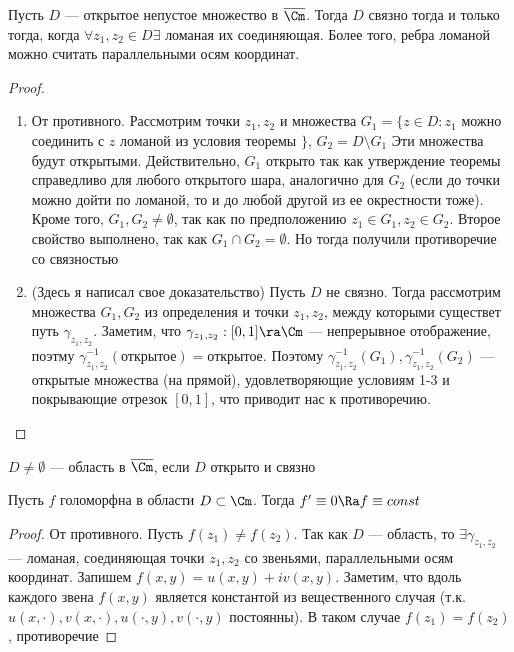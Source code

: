 \begin{proposition}
    Пусть \(D\) --- открытое непустое множество в \(\overline{\Cm}\). Тогда \(D\) связно тогда и только тогда, когда \(\forall z_1, z_2 \in D \exists\) ломаная их соединяющая. Более того, ребра ломаной можно считать параллельными осям координат.
\end{proposition}
\begin{proof}
    \begin{enumerate}
        \item[\(\Ra\)] От противного. Рассмотрим точки \(z_1, z_2\) и множества \(G_1 = \{z \in D: z_1\) можно соединить с \(z\) ломаной из условия теоремы \(\}\), \(G_2 = D \setminus G_1\) Эти множества будут открытыми. Действительно, \(G_1\) открыто так как утверждение теоремы справедливо для любого открытого шара, аналогично для \(G_2\) (если до точки можно дойти по ломаной, то и до любой другой из ее окрестности тоже). Кроме того, \(G_1, G_2 \ne \emptyset\), так как по предположению \(z_1 \in G_1, z_2 \in G_2\). Второе свойство выполнено, так как \(G_1 \cap G_2 = \emptyset\). Но тогда получили противоречие со связностью
        \item[\(\La\)] (Здесь я написал свое доказательство) Пусть \(D\) не связно. Тогда рассмотрим множества \(G_1, G_2\) из определения и точки \(z_1, z_2\), между которыми существет путь \(\gamma_{z_1, z_2}\). Заметим, что \(\gamma_{z_1, z_2}: [0, 1] \ra \Cm\) --- непрерывное отображение, поэтму \(\gamma_{z_1, z_2}^{-1}(\text{открытое}) = \text{открытое}\). Поэтому \(\gamma_{z_1, z_2}^{-1}(G_1), \gamma_{z_1, z_2}^{-1}(G_2)\) --- открытые множества (на прямой), удовлетворяющие условиям 1-3 и покрывающие отрезок \([0, 1]\), что приводит нас к противоречию.
    \end{enumerate}
\end{proof}

\begin{definition}
    \(D \ne \emptyset\) --- область в \(\overline{\Cm}\), если \(D\) открыто и связно
\end{definition}

\begin{theorem}
    Пусть \(f\) голоморфна в области \(D \subset \Cm\). Тогда \(f' \equiv 0 \Ra f \equiv const\)
\end{theorem}
\begin{proof}
    От противного. Пусть \(f(z_1) \ne f(z_2)\). Так как \(D\) --- область, то \(\exists \gamma_{z_1, z_2}\) --- ломаная, соединяющая точки \(z_1, z_2\) со звеньями, параллельными осям координат. Запишем \(f(x, y) = u(x, y) + i v(x, y)\). Заметим, что вдоль каждого звена \(f(x, y)\) является константой из вещественного случая (т.к. \(u(x, \cdot), v(x, \cdot), u(\cdot, y), v(\cdot, y)\) постоянны). В таком случае \(f(z_1) = f(z_2)\), противоречие
\end{proof}

